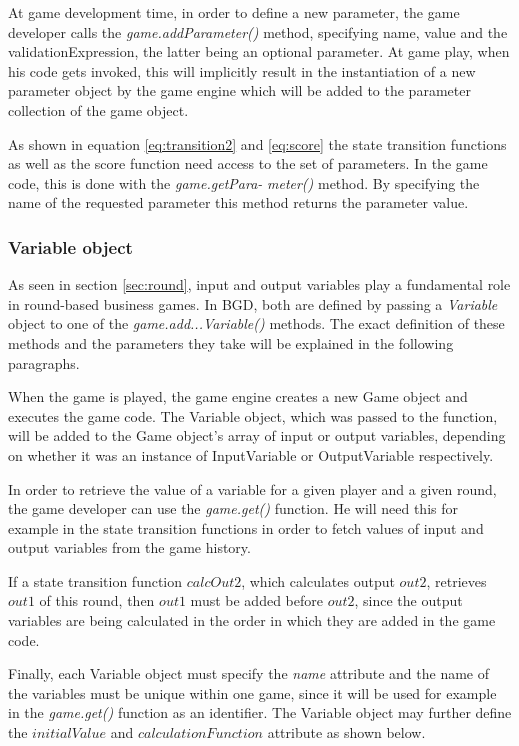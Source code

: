 At game development time, in order to define a new parameter, the game developer calls the \textit{game.addParameter()} method, specifying name, value and the validationExpression, the latter being an optional parameter. At game play, when his code gets invoked, this will implicitly result in the instantiation of a new parameter object by the game engine which will be added to the parameter collection of the game object. 

As shown in equation \ref{eq:transition2} and \ref{eq:score} the state transition functions as well as the score function need access to the set of parameters. In the game code, this is done with the \textit{game.getPara-} \newline \textit{meter()} method. By specifying the name of the requested parameter this method returns the parameter value.

\subsubsection{Variable object}
\label{subsub:variables}

As seen in section \ref{sec:round}, input and output variables play a fundamental role in round-based business games. In BGD, both are defined by passing a \textit{Variable} object to one of the \textit{game.add...Variable()} methods. The exact definition of these methods and the parameters they take will be explained in the following paragraphs. 

When the game is played, the game engine creates a new Game object and executes the game code. The Variable object, which was passed to the function, will be added to the Game object's array of input or output variables, depending on whether it was an instance of InputVariable or OutputVariable respectively. 

In order to retrieve the value of a variable for a given player and a given round, the game developer can use the \textit{game.get()} function. He will need this for example in the state transition functions in order to fetch values of input and output variables from the game history.

If a state transition function $calcOut2$, which calculates output $out2$, retrieves $out1$ of this round, then $out1$ must be added before $out2$, since the output variables are being calculated in the order in which they are added in the game code.

Finally, each Variable object must specify the \textit{name} attribute and the name of the variables must be unique within one game, since it will be used for example in the \textit{game.get()} function as an identifier. The Variable object may further define the $initialValue$ and $calculationFunction$ attribute as shown below.


